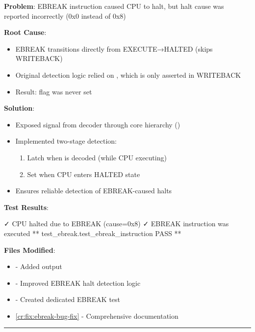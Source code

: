 \begin{record}

\textbf{Problem}: EBREAK instruction caused CPU to halt, but halt cause
was reported incorrectly (0x0 instead of 0x8)

\textbf{Root Cause}:

\begin{itemize}
\tightlist
\item
  EBREAK transitions directly from EXECUTE→HALTED (skips WRITEBACK)
\item
  Original detection logic relied on , which is only
  asserted in WRITEBACK
\item
  Result:  flag was never set
\end{itemize}

\textbf{Solution}:

\begin{itemize}
\tightlist
\item
  Exposed  signal from decoder through core hierarchy
  ()
\item
  Implemented two-stage detection:

  \begin{enumerate}
  \def\labelenumi{\arabic{enumi}.}
  \tightlist
  \item
    Latch when  is decoded (while CPU executing)
  \item
    Set  when CPU enters HALTED state
  \end{enumerate}
\item
  Ensures reliable detection of EBREAK-caused halts
\end{itemize}

\textbf{Test Results}:

\begin{textblock}
✓ CPU halted due to EBREAK (cause=0x8)
✓ EBREAK instruction was executed
** test_ebreak.test_ebreak_instruction   PASS **
\end{textblock}

\textbf{Files Modified}:

\begin{itemize}
\tightlist
\item
   - Added  output
\item
   - Improved EBREAK halt detection logic
\item
   - Created dedicated EBREAK test
\item
  \cref{cr:fix:ebreak-bug-fix} - Comprehensive documentation
\end{itemize}

\begin{center}\rule{0.5\linewidth}{0.5pt}\end{center}

\end{record}

